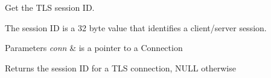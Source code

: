 Get the T\+LS session ID. 

The session ID is a 32 byte value that identifies a client/server session. 
\begin{DoxyParams}{Parameters}
{\em conn} & is a pointer to a Connection \\
\hline
\end{DoxyParams}
\begin{DoxyReturn}{Returns}
the session ID for a T\+LS connection, N\+U\+LL otherwise 
\end{DoxyReturn}
